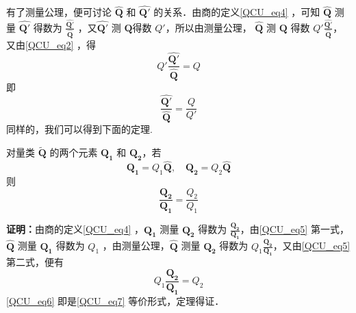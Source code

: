 有了测量公理，便可讨论 $\hat{\boldsymbol{Q}}$ 和 $\hat{\boldsymbol{Q'}}$ 的关系．由商的定义\autoref{QCU_eq4} ，可知 $\hat{\boldsymbol{Q}}$ 测量 $\hat{\boldsymbol{Q'}}$ 得数为 $\frac{\hat{\boldsymbol{Q'}}}{\hat{\boldsymbol{Q}}}$ ，又$\hat{\boldsymbol{Q'}}$ 测 $\boldsymbol{Q}$得数 $Q'$，所以由测量公理， $\hat{\boldsymbol{Q}}$ 测 $\boldsymbol{Q}$ 得数 $Q'\frac{\hat{\boldsymbol{Q'}}}{\hat{\boldsymbol{Q}}}$，又由\autoref{QCU_eq2} ，得
\begin{equation}
Q'\frac{\hat{\boldsymbol{Q'}}}{\hat{\boldsymbol{Q}}}=Q
\end{equation}
即
\begin{equation}\label{QCU_eq8}
\frac{\hat{\boldsymbol{Q'}}}{\hat{\boldsymbol{Q}}}=\frac{Q}{Q'}
\end{equation}
同样的，我们可以得到下面的定理.
\begin{theorem}{}\label{QCU_the1}
对量类 $\widetilde{\boldsymbol{Q}}$ 的两个元素 $\boldsymbol{Q_1}$ 和 $\boldsymbol{Q_2}$，若
\begin{equation}\label{QCU_eq5}
\boldsymbol{Q_1}=Q_1\hat{\boldsymbol{Q}},\quad \boldsymbol{Q_2}=Q_2\hat{\boldsymbol{Q}}
\end{equation}
则
\begin{equation}\label{QCU_eq7}
\frac{\boldsymbol{Q_2}}{\boldsymbol{Q_1}}=\frac{Q_2}{Q_1}
\end{equation}
\end{theorem}
\textbf{证明：}由商的定义\autoref{QCU_eq4} ，$\boldsymbol{Q_1}$ 测量 $\boldsymbol{Q_2}$ 得数为 $\frac{\boldsymbol{Q_2}}{\boldsymbol{Q_1}}$，由\autoref{QCU_eq5} 第一式， $\hat{\boldsymbol{Q}}$ 测量 $\boldsymbol{Q_1}$ 得数为 $Q_1$ ，由测量公理，$\hat{\boldsymbol{Q}}$ 测量 $\boldsymbol{Q_2}$ 得数为 $Q_1\frac{\boldsymbol{Q_2}}{\boldsymbol{Q_1}}$，又由\autoref{QCU_eq5} 第二式，便有
\begin{equation}\label{QCU_eq6}
Q_1\frac{\boldsymbol{Q_2}}{\boldsymbol{Q_1}}=Q_2
\end{equation}
\autoref{QCU_eq6} 即是\autoref{QCU_eq7} 等价形式，定理得证．

